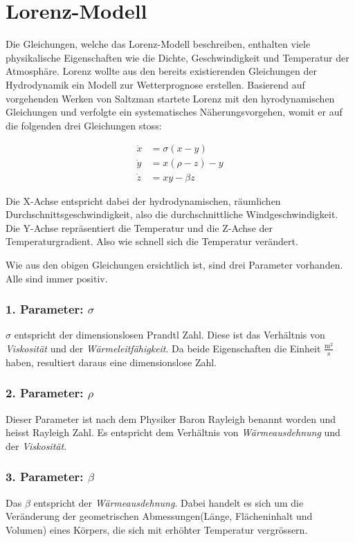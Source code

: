 

\section{Lorenz-Modell}\label{lorenz-modell}
Die Gleichungen, welche das Lorenz-Modell beschreiben, enthalten viele physikalische Eigenschaften wie die Dichte, Geschwindigkeit und Temperatur der Atmosphäre. Lorenz wollte aus den bereits existierenden Gleichungen der Hydrodynamik ein Modell zur Wetterprognose erstellen. Basierend auf vorgehenden Werken von Saltzman startete Lorenz mit den hyrodynamischen Gleichungen und verfolgte ein systematisches Näherungsvorgehen, womit er auf die folgenden drei Gleichungen stoss:

\begin{align}
\dot{x} &= \sigma(x - y)\\
\dot{y} &= x(\rho - z) - y\\
\dot{z} &= xy - \beta z
\end{align}

Die X-Achse entspricht dabei der hydrodynamischen, räumlichen Durchschnittsgeschwindigkeit, also die durchschnittliche Windgeschwindigkeit. Die Y-Achse repräsentiert die Temperatur und die Z-Achse der Temperaturgradient. Also wie schnell sich die Temperatur verändert. 

Wie aus den obigen Gleichungen ersichtlich ist, sind drei Parameter vorhanden. Alle sind immer positiv.

\subsubsection{1. Parameter: $\sigma$}
$\sigma$ entspricht der dimensionslosen Prandtl Zahl. Diese ist das Verhältnis von \textit{Viskosität} und der \textit{Wärmeleitfähigkeit}. Da beide Eigenschaften die Einheit $\frac{\text{m}^2}{\text{s}}$ haben, resultiert daraus eine dimensionslose Zahl.

\subsubsection{2. Parameter: $\rho$}
Dieser Parameter ist nach dem Physiker Baron Rayleigh benannt worden und heisst Rayleigh Zahl. Es entspricht dem Verhältnis von \textit{Wärmeausdehnung} und der \textit{Viskosität}.

\subsubsection{3. Parameter: $\beta$}
Das $ \beta $ entspricht der \textit{Wärmeausdehnung}. Dabei handelt es sich um die Veränderung der geometrischen Abmessungen(Länge, Flächeninhalt und Volumen) eines Körpers, die sich mit erhöhter Temperatur vergrössern.

